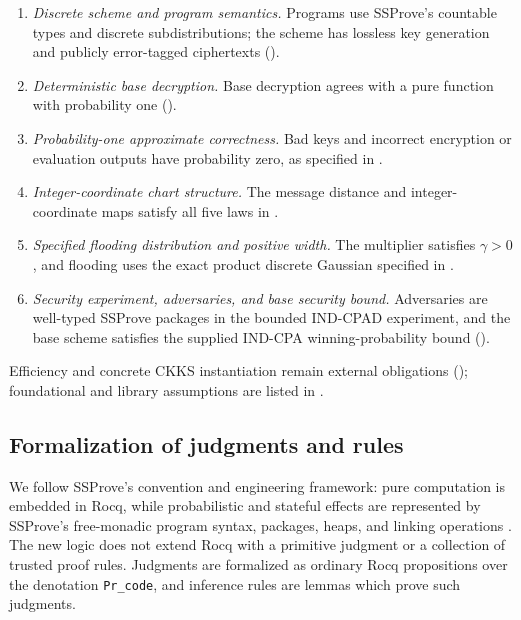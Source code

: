 \begin{enumerate}
\item \emph{Discrete scheme and program semantics.}
Programs use SSProve's countable types and discrete subdistributions; the
scheme has lossless key generation and publicly error-tagged ciphertexts
().

\item \emph{Deterministic base decryption.}
Base decryption agrees with a pure function with probability one
().

\item \emph{Probability-one approximate correctness.}
Bad keys and incorrect encryption or evaluation outputs have probability zero,
as specified in .

\item \emph{Integer-coordinate chart structure.}
The message distance and integer-coordinate maps satisfy all five laws in
.

\item \emph{Specified flooding distribution and positive width.}
The multiplier satisfies \(\gamma>0\), and flooding uses the exact product
discrete Gaussian specified in .

\item \emph{Security experiment, adversaries, and base security bound.}
Adversaries are well-typed SSProve packages in the bounded IND-CPAD experiment,
and the base scheme satisfies the supplied IND-CPA winning-probability bound
().
\end{enumerate}

Efficiency and concrete CKKS instantiation remain external obligations
(); foundational and library assumptions are listed in
.

\subsection{Formalization of judgments and rules}

We follow SSProve's convention and engineering framework: pure computation is
embedded in Rocq, while probabilistic and stateful effects are represented by
SSProve's free-monadic program syntax, packages, heaps, and linking operations
\cite{ssprove}.  The new logic does not extend Rocq with a primitive judgment
or a collection of trusted proof rules.
Judgments are formalized as ordinary Rocq propositions over the denotation \texttt{Pr\_code},
and inference rules are lemmas which prove such judgments.

